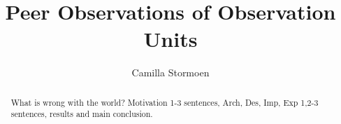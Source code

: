 \documentclass[USenglish]{uit-thesis}
\begin{document}

\title{Peer Observations of Observation Units}
\author{Camilla Stormoen}

\maketitle

\frontmatter





\begin{abstract}
What is wrong with the world? Motivation 1-3 sentences, Arch, Des, Imp, Exp 1,2-3 sentences, results and main conclusion.




\end{abstract}

\begin{acknowledgement}


\end{acknowledgement}
\end{document}
